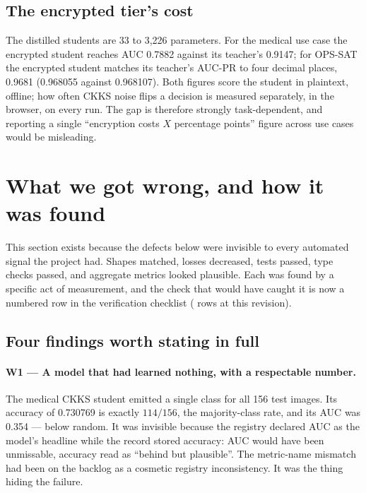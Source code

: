 \documentclass[11pt,a4paper]{article}
\begin{document}
\subsection{The encrypted tier's cost}
The distilled students are 33 to 3{,}226 parameters. For the medical use case the encrypted student
reaches AUC 0.7882 against its teacher's 0.9147; for OPS-SAT the encrypted student matches its
teacher's AUC-PR to four decimal places, 0.9681 (0.968055 against 0.968107). Both figures score the
student in plaintext, offline; how often CKKS noise flips a decision is measured separately, in the
browser, on every run. The gap is therefore strongly task-dependent, and reporting a single
``encryption costs $X$ percentage points'' figure across use cases would be misleading.

\section{What we got wrong, and how it was found}
\label{sec:wrong}

This section exists because the defects below were invisible to every automated signal the project
had. Shapes matched, losses decreased, tests passed, type checks passed, and aggregate metrics looked
plausible. Each was found by a specific act of measurement, and the check that would have caught it
is now a numbered row in the verification checklist (\nchecklistrows{} rows at this revision).



\subsection{Four findings worth stating in full}

\paragraph{W1 --- A model that had learned nothing, with a respectable number.}
The medical CKKS student emitted a single class for all 156 test images. Its accuracy of 0.730769 is
exactly $114/156$, the majority-class rate, and its AUC was 0.354 --- below random. It was invisible
because the registry declared AUC as the model's headline while the record stored accuracy: AUC
would have been unmissable, accuracy read as ``behind but plausible''. The metric-name mismatch had
been on the backlog as a cosmetic registry inconsistency. It was the thing hiding the failure.
\end{document}
